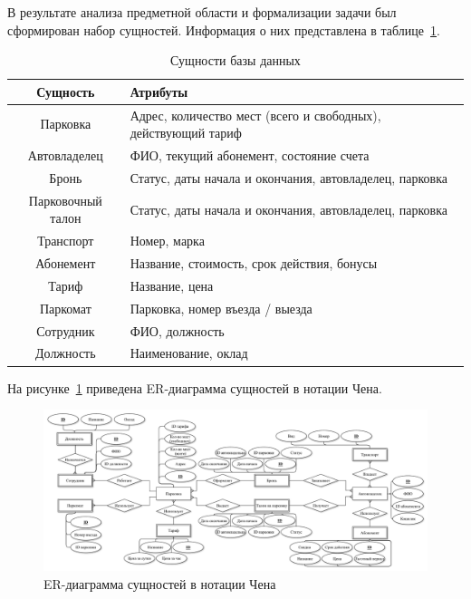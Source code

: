 В результате анализа предметной области и формализации задачи был сформирован набор сущностей.
Информация о них представлена в таблице~\ref{tab:ER}.

\begin{table}[H]
	\begin{center}
		\begin{center}
			\caption{\label{tab:ER}Сущности базы данных}
		\end{center}
		\begin{tabular}{|c|p{10cm}|}
			\hline 
			Сущность & Атрибуты \\ \hline
        Парковка & Адрес, количество мест (всего и свободных), действующий тариф  \\ \hline
        Автовладелец & ФИО, текущий абонемент, состояние счета \\ \hline
        Бронь & Статус, даты начала и окончания, автовладелец, парковка \\ \hline
        Парковочный талон & Статус, даты начала и окончания, автовладелец, парковка \\ \hline
        Транспорт & Номер, марка \\ \hline
        Абонемент & Название, стоимость, срок действия, бонусы \\ \hline
        Тариф & Название, цена \\ \hline
        Паркомат & Парковка, номер въезда / выезда \\ \hline
        Сотрудник & ФИО, должность \\ \hline
        Должность & Наименование, оклад \\ \hline
		\end{tabular}
	\end{center}
\end{table}

На рисунке~\ref{fig:ER_chen} приведена ER-диаграмма сущностей в нотации Чена.
\begin{figure}[h]
	\centering
	\includegraphics[height=0.5\textheight, width=1.4\textwidth, angle=90]{svg/ER_chen}
	\caption{ER-диаграмма сущностей в нотации Чена}
	\label{fig:ER_chen}
\end{figure}

